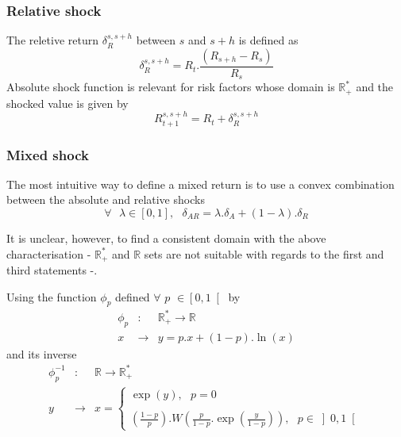 \documentclass[10pt,a4paper]{report}
\begin{document}
\subsubsection{Relative shock}

The reletive return $\delta _{R}^{s,s+h}$ between $s$ and $s+h$ is defined as%
\begin{equation*}
\delta _{R}^{s,s+h}=R_{t}.\frac{\left( R_{s+h}-R_{s}\right) }{R_{s}}
\end{equation*}%
Absolute shock function is relevant for risk factors whose domain is $%
\mathbb{R}_{+}^{\ast }$ and the shocked value is given by 
\begin{equation*}
R_{t+1}^{s,s+h}=R_{t}+\delta _{R}^{s,s+h}
\end{equation*}

\subsubsection{Mixed shock}

The most intuitive way to define a mixed return is to use a convex
combination between the absolute and relative shocks 
\begin{equation*}
\forall \text{ }\lambda \in \left[ 0,1\right] ,\text{ \ \ }\delta
_{AR}=\lambda .\delta _{A}+(1-\lambda ).\delta _{R}
\end{equation*}

It is unclear, however, to find a consistent domain with the above
characterisation - $\mathbb{R}_{+}^{\ast }$ and $\mathbb{R}$ sets are not
suitable with regards to the first and third statements -.\\ 

\bigskip


Using the function $\phi _{p}$ defined $\forall $ $p$ $\in \left[ 0,1\right[ 
$ by%
\begin{eqnarray*}
\phi _{p} &:&\mathbb{R}_{+}^{\ast }\rightarrow \mathbb{R} \\
x &\rightarrow &y=p.x+(1-p).\ln (x)
\end{eqnarray*}%
and its inverse 
\begin{eqnarray*}
\phi _{p}^{-1} &:&\mathbb{R}\rightarrow \mathbb{R}_{+}^{\ast } \\
y &\rightarrow &x=\left\{ 
\begin{array}{c}
\exp (y),\text{ \ \ \ \ \ \ \ \ \ \ \ \ \ \ \ \ \ \ \ \ \ \ \ \ \ }p=0 \\ 
\\ 
\left( \frac{1-p}{p}\right) .W\left( \frac{p}{1-p}.\exp \left( \frac{y}{1-p}%
\right) \right) ,\text{ }p\in \left] 0,1\right[ 
\end{array}%
\right. 
\end{eqnarray*}
\end{document}
